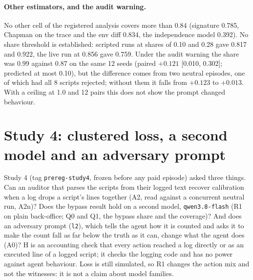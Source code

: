 \documentclass[11pt]{article}
\begin{document}
\paragraph{Other estimators, and the audit warning.} No other cell of the registered
analysis covers more than 0.84 (signature 0.785, Chapman on the trace and the env diff
0.834, the independence model 0.392). No share threshold is established: scripted runs at
shares of 0.10 and 0.28 gave 0.817 and 0.922, the live run at 0.856 gave 0.759. Under the
audit warning the share was 0.99 against 0.87 on the same 12 seeds (paired $+0.121$ [0.010,
0.302]; predicted at most 0.10), but the difference comes from two neutral episodes, one of
which had all 8 scripts rejected; without them it falls from $+0.123$ to $+0.013$. With a
ceiling at 1.0 and 12 pairs this does not show the prompt changed behaviour.

\section{Study 4: clustered loss, a second model and an adversary prompt}
\label{sec:study4}

Study 4 (tag \texttt{prereg-study4}, frozen before any paid episode) asked three things. Can
an auditor that parses the scripts from their logged text recover calibration when a log
drops a script's lines together (A2, read against a concurrent neutral run, A2n)? Does the
bypass result hold on a second model, \texttt{qwen3.8-flash} (R1 on plain back-office; Q0 and
Q1, the bypass share and the coverage)? And does an adversary prompt (\texttt{l2}), which
tells the agent how it is counted and asks it to make the count fall as far below the truth
as it can, change what the agent does (A0)? H is an accounting check that every action
reached a log directly or as an executed line of a logged script; it checks the logging code
and has no power against agent behaviour. Loss is still simulated, so R1 changes the action
mix and not the witnesses: it is not a claim about model families.
\end{document}
